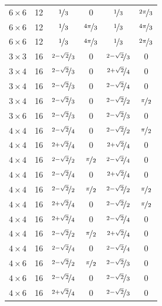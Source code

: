 \documentclass{article}
\begin{document}
\begin{longtable}{cccccc}
$6 \times 6$ & 12 & $\nicefrac{1}{3}$ & 0 & $\nicefrac{1}{3}$ & $\nicefrac{2\pi}{3}$ \\
$6 \times 6$ & 12 & $\nicefrac{1}{3}$ & $\nicefrac{4\pi}{3}$ & $\nicefrac{1}{3}$ & $\nicefrac{4\pi}{3}$ \\
$6 \times 6$ & 12 & $\nicefrac{1}{3}$ & $\nicefrac{4\pi}{3}$ & $\nicefrac{1}{3}$ & $\nicefrac{2\pi}{3}$ \\
$3 \times 3$ & 16 & $\nicefrac{2-\sqrt{2}}{3}$ & 0 & $\nicefrac{2-\sqrt{2}}{3}$ & 0 \\
$3 \times 4$ & 16 & $\nicefrac{2-\sqrt{2}}{3}$ & 0 & $\nicefrac{2+\sqrt{2}}{4}$ & 0 \\
$3 \times 4$ & 16 & $\nicefrac{2-\sqrt{2}}{3}$ & 0 & $\nicefrac{2-\sqrt{2}}{4}$ & 0 \\
$3 \times 4$ & 16 & $\nicefrac{2-\sqrt{2}}{3}$ & 0 & $\nicefrac{2-\sqrt{2}}{2}$ & $\nicefrac{\pi}{2}$ \\
$3 \times 6$ & 16 & $\nicefrac{2-\sqrt{2}}{3}$ & 0 & $\nicefrac{2-\sqrt{2}}{3}$ & 0 \\
$4 \times 4$ & 16 & $\nicefrac{2-\sqrt{2}}{4}$ & 0 & $\nicefrac{2-\sqrt{2}}{2}$ & $\nicefrac{\pi}{2}$ \\
$4 \times 4$ & 16 & $\nicefrac{2+\sqrt{2}}{4}$ & 0 & $\nicefrac{2+\sqrt{2}}{4}$ & 0 \\
$4 \times 4$ & 16 & $\nicefrac{2-\sqrt{2}}{2}$ & $\nicefrac{\pi}{2}$ & $\nicefrac{2-\sqrt{2}}{4}$ & 0 \\
$4 \times 4$ & 16 & $\nicefrac{2-\sqrt{2}}{4}$ & 0 & $\nicefrac{2+\sqrt{2}}{4}$ & 0 \\
$4 \times 4$ & 16 & $\nicefrac{2-\sqrt{2}}{2}$ & $\nicefrac{\pi}{2}$ & $\nicefrac{2-\sqrt{2}}{2}$ & $\nicefrac{\pi}{2}$ \\
$4 \times 4$ & 16 & $\nicefrac{2+\sqrt{2}}{4}$ & 0 & $\nicefrac{2-\sqrt{2}}{2}$ & $\nicefrac{\pi}{2}$ \\
$4 \times 4$ & 16 & $\nicefrac{2+\sqrt{2}}{4}$ & 0 & $\nicefrac{2-\sqrt{2}}{4}$ & 0 \\
$4 \times 4$ & 16 & $\nicefrac{2-\sqrt{2}}{2}$ & $\nicefrac{\pi}{2}$ & $\nicefrac{2+\sqrt{2}}{4}$ & 0 \\
$4 \times 4$ & 16 & $\nicefrac{2-\sqrt{2}}{4}$ & 0 & $\nicefrac{2-\sqrt{2}}{4}$ & 0 \\
$4 \times 6$ & 16 & $\nicefrac{2-\sqrt{2}}{2}$ & $\nicefrac{\pi}{2}$ & $\nicefrac{2-\sqrt{2}}{3}$ & 0 \\
$4 \times 6$ & 16 & $\nicefrac{2-\sqrt{2}}{4}$ & 0 & $\nicefrac{2-\sqrt{2}}{3}$ & 0 \\
$4 \times 6$ & 16 & $\nicefrac{2+\sqrt{2}}{4}$ & 0 & $\nicefrac{2-\sqrt{2}}{3}$ & 0 \\

\end{longtable}
\end{document}
